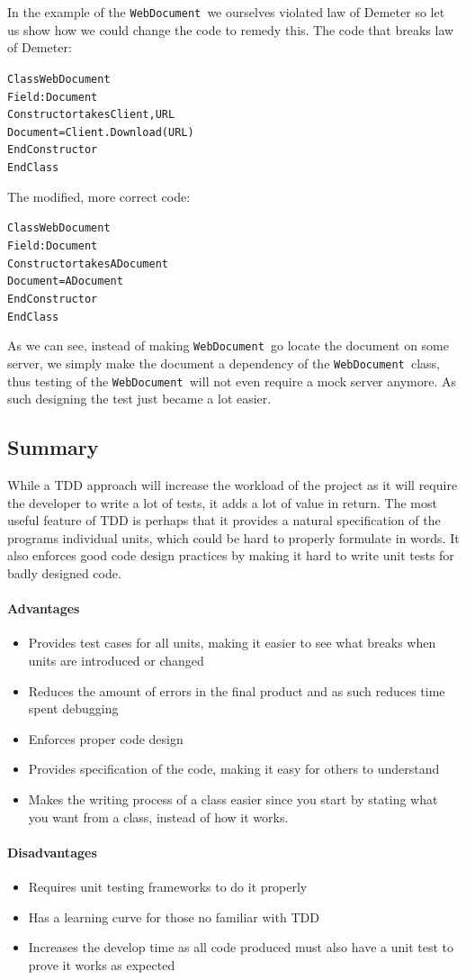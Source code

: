 In the example of the \texttt{WebDocument }we ourselves violated law
of Demeter so let us show how we could change the code to remedy this.
The code that breaks law of Demeter:

\begin{alltt}
Class WebDocument 	
    Field: Document 	
    Constructor takes Client, URL 		
        Document = Client.Download(URL) 	
    EndConstructor 
EndClass
\end{alltt}

The modified, more correct code:

\begin{alltt}
Class WebDocument 	
    Field: Document 	
    Constructor takes ADocument 		
        Document = ADocument 	
    EndConstructor 
EndClass
\end{alltt}

As we can see, instead of making \texttt{WebDocument }go locate the
document on some server, we simply make the document a dependency
of the \texttt{WebDocument }class, thus testing of the \texttt{WebDocument
}will not even require a mock server anymore. As such designing the
test just became a lot easier.


\subsection*{Summary}

While a TDD approach will increase the workload of the project as
it will require the developer to write a lot of tests, it adds a lot
of value in return. The most useful feature of TDD is perhaps that
it provides a natural specification of the programs individual units,
which could be hard to properly formulate in words. It also enforces
good code design practices by making it hard to write unit tests for
badly designed code.


\paragraph*{Advantages}
\begin{itemize}
\item Provides test cases for all units, making it easier to see what breaks
when units are introduced or changed
\item Reduces the amount of errors in the final product and as such reduces
time spent debugging
\item Enforces proper code design
\item Provides specification of the code, making it easy for others to understand
\item Makes the writing process of a class easier since you start by stating
what you want from a class, instead of how it works.
\end{itemize}

\paragraph*{Disadvantages}
\begin{itemize}
\item Requires unit testing frameworks to do it properly
\item Has a learning curve for those no familiar with TDD
\item Increases the develop time as all code produced must also have a unit
test to prove it works as expected\end{itemize}

